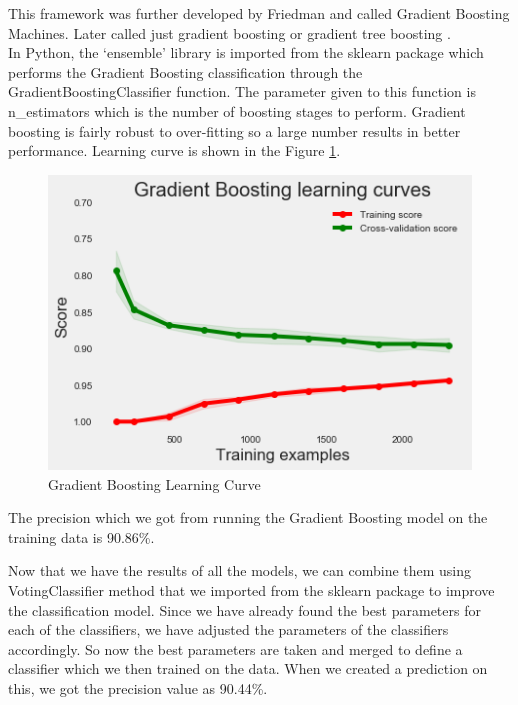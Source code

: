 This framework was further developed by Friedman and called Gradient Boosting Machines. Later called just gradient boosting or gradient tree boosting \cite{link15}.\\
In Python, the `ensemble' library is imported from the sklearn package which performs the Gradient Boosting classification through the GradientBoostingClassifier function. The parameter given to this function is n\_estimators which is the number of boosting stages to perform. Gradient boosting is fairly robust to over-fitting so a large number results in better performance. Learning curve is shown in the Figure \ref{5.4}.

\begin{figure}
\caption{Gradient Boosting Learning Curve}
\label{5.4}
\centering
\includegraphics[width=\columnwidth]{images/5_4.png}
\end{figure}

The precision which we got from running the Gradient Boosting model on the training data is 90.86\%.

Now that we have the results of all the models, we can combine them using VotingClassifier method that we imported from the sklearn package to improve the classification model. Since we have already found the best parameters for each of the classifiers, we have adjusted the parameters of the classifiers accordingly. So now the best parameters are taken and merged to define a classifier which  we then trained on the data. When we created a prediction on this, we got the precision value as 90.44\%.

